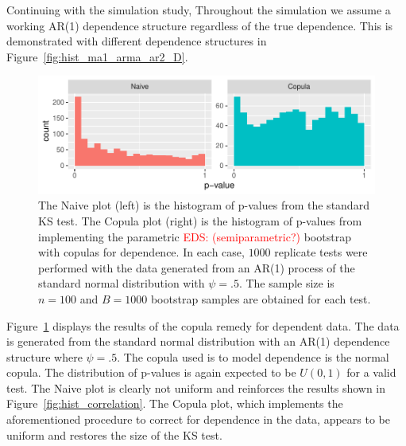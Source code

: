 \documentclass[12pt, letterpaper, titlepage]{article}
\newcommand{\eds}[1]{\textcolor{red}{EDS: (#1)}}
\begin{document}
Continuing with the simulation study, 
Throughout the simulation we assume a working AR(1) dependence structure
regardless of the true dependence. This is demonstrated with different dependence
structures in Figure~\ref{fig:hist_ma1_arma_ar2_D}.

\begin{figure}[tbp]
  \centering
  \includegraphics[width=\textwidth]{hist_ar1_D}
  \caption{The Naive plot (left) is the histogram of p-values from the
  standard KS test. The Copula plot (right) is the histogram of p-values from
  implementing the parametric \eds{semiparametric?} bootstrap with copulas for
	dependence. In each case,
  $1000$ replicate tests were performed with the data generated from an AR(1)
  process of the standard normal distribution with $\psi = .5$. The sample size
  is $n = 100$ and $B = 1000$ bootstrap samples are obtained for each test.}
  \label{fig:hist_ar1_D}
\end{figure}

Figure~\ref{fig:hist_ar1_D} displays the results of the copula remedy for
dependent data. The data is generated from the standard normal distribution with
an AR(1) dependence structure where $\psi = .5$. The copula used is to model
dependence is the normal copula. The distribution of p-values is again expected
to be $U(0, 1)$ for a valid test. The Naive plot is clearly not uniform and
reinforces the results shown in Figure~\ref{fig:hist_correlation}. The Copula
plot, which implements the aforementioned procedure to correct for dependence
in the data, appears to be uniform and restores the size of the KS test.
\end{document}
